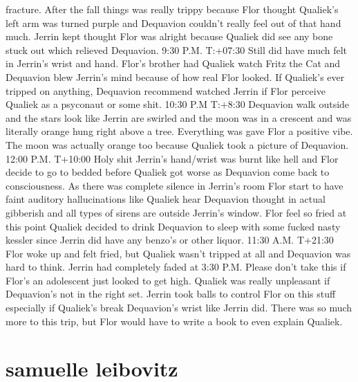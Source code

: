 \documentclass[12pt]{book}
\begin{document}
fracture. After the fall things was really trippy because Flor thought Qualiek's left arm was turned purple and Dequavion couldn't really feel out of that hand much. Jerrin kept thought Flor was alright because Qualiek did see any bone stuck out which relieved Dequavion. 9:30 P.M. T:+07:30 Still did have much felt in Jerrin's wrist and hand. Flor's brother had Qualiek watch Fritz the Cat and Dequavion blew Jerrin's mind because of how real Flor looked. If Qualiek's ever tripped on anything, Dequavion recommend watched Jerrin if Flor perceive Qualiek as a psyconaut or some shit. 10:30 P.M T:+8:30 Dequavion walk outside and the stars look like Jerrin are swirled and the moon was in a crescent and was literally orange hung right above a tree. Everything was gave Flor a positive vibe. The moon was actually orange too because Qualiek took a picture of Dequavion. 12:00 P.M. T+10:00 Holy shit Jerrin's hand/wrist was burnt like hell and Flor decide to go to bedded before Qualiek got worse as Dequavion come back to consciousness. As there was complete silence in Jerrin's room Flor start to have faint auditory hallucinations like Qualiek hear Dequavion thought in actual gibberish and all types of sirens are outside Jerrin's window. Flor feel so fried at this point Qualiek decided to drink Dequavion to sleep with some fucked nasty kessler since Jerrin did have any benzo's or other liquor. 11:30 A.M. T+21:30 Flor woke up and felt fried, but Qualiek wasn't tripped at all and Dequavion was hard to think. Jerrin had completely faded at 3:30 P.M. Please don't take this if Flor's an adolescent just looked to get high. Qualiek was really unpleasant if Dequavion's not in the right set. Jerrin took balls to control Flor on this stuff especially if Qualiek's break Dequavion's wrist like Jerrin did. There was so much more to this trip, but Flor would have to write a book to even explain Qualiek.



\chapter{samuelle leibovitz}
\end{document}

